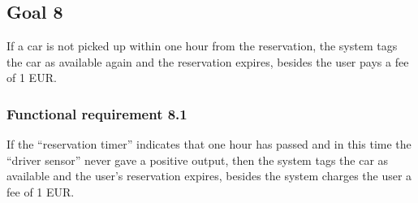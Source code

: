 \subsection{Goal 8}
If a car is not picked up within one hour from the reservation, the system tags the car as available again and the reservation expires, besides the user pays a fee of 1 EUR.

\setcounter{secnumdepth}{3}
\subsubsection{Functional requirement 8.1}
If the “reservation timer” indicates that one hour has passed and in this time the “driver sensor” never gave a positive output, then the system tags the car as available and the user’s reservation expires, besides the system charges the user a fee of 1 EUR.